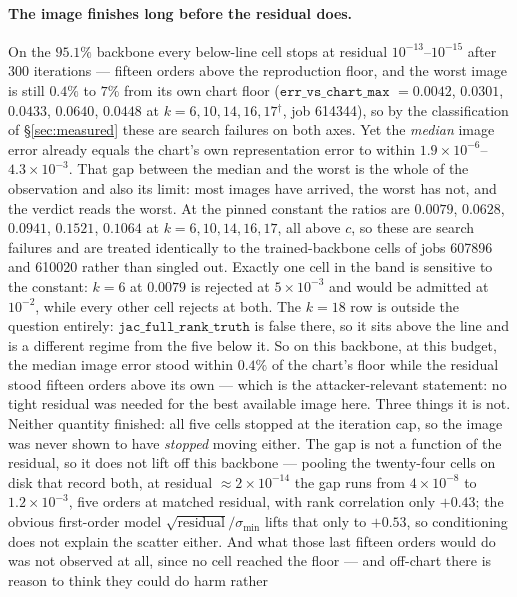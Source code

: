 \paragraph{The image finishes long before the residual does.} On the
$95.1\%$ backbone every below-line cell stops at residual
$10^{-13}$--$10^{-15}$ after $300$ iterations — fifteen orders above the
reproduction floor, and the worst image is still $0.4\%$ to $7\%$ from its own
chart floor ($\mathtt{err\_vs\_chart\_max}$ $=0.0042$, $0.0301$, $0.0433$,
$0.0640$, $0.0448$ at $k=6,10,14,16,17$$^\dagger$, job 614344), so by the
classification of \S\ref{sec:measured} these are search failures on both axes.
Yet the \emph{median} image error already equals the chart's own representation
error to within $1.9\times10^{-6}$--$4.3\times10^{-3}$. That gap between the
median and the worst is the whole of the observation and also its limit: most
images have arrived, the worst has not, and the verdict reads the worst. At the
pinned constant the ratios are $0.0079$, $0.0628$, $0.0941$, $0.1521$, $0.1064$
at $k=6,10,14,16,17$, all above $c$, so these are search failures and are
treated identically to the trained-backbone cells of jobs 607896 and 610020
rather than singled out. Exactly one cell in the band is sensitive to the
constant: $k=6$ at $0.0079$ is rejected at $5\times10^{-3}$ and would be
admitted at $10^{-2}$, while every other cell rejects at both. The $k=18$ row is
outside the question entirely: $\mathtt{jac\_full\_rank\_truth}$ is false there,
so it sits above the line and is a different regime from the five below it. So on this backbone, at this budget, the median image error stood within
$0.4\%$ of the chart's floor while the residual stood fifteen orders above
its own — which is the attacker-relevant statement: no tight residual was
needed for the best available image here. Three things it is not. Neither
quantity finished: all five cells stopped at the iteration cap, so the image
was never shown to have \emph{stopped} moving either. The gap is not a
function of the residual, so it does not lift off this backbone — pooling
the twenty-four cells on disk that record both, at residual
$\approx2\times10^{-14}$ the gap runs from $4\times10^{-8}$ to
$1.2\times10^{-3}$, five orders at matched residual, with rank correlation
only $+0.43$; the obvious first-order model $\sqrt{\text{residual}}/
\sigma_{\min}$ lifts that only to $+0.53$, so conditioning does not explain
the scatter either. And what those last fifteen orders would do was not
observed at all, since no cell reached the floor — and off-chart there is reason to think they could do harm rather
$$
